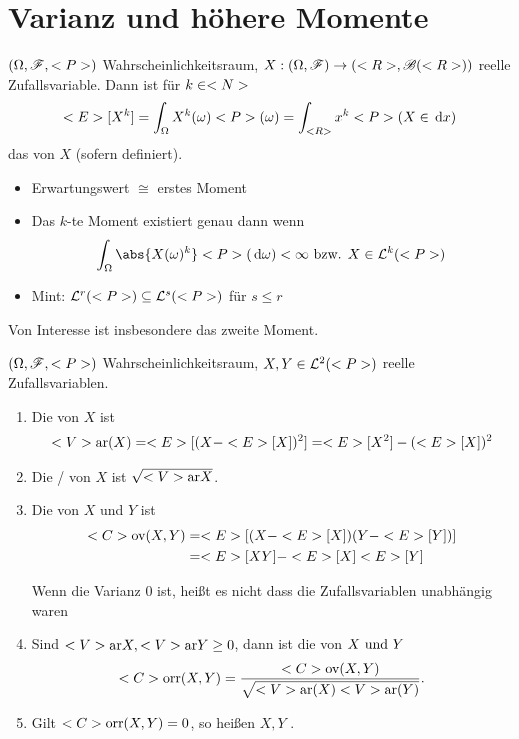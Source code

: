 \section{Varianz und höhere Momente}
\begin{definition}[$k$-te Momente]
	$(\Omega,\mathscr F,<P>)$ Wahrscheinlichkeitsraum, $X: (\Omega,\mathscr F) \to (<R>, \mathscr{B}(<R>))$ reelle Zufallsvariable. Dann ist für $k \in <N>$
	\begin{align*}
		<E>[X^k] = \int_{\Omega} X^k(\omega)<P>(\omega) = \int_{<R>}x^k <P>(X \in \,\mathrm{d} x)
	\end{align*}
	das  von $X$ (sofern definiert).
\end{definition}
\begin{*remark}
	\begin{itemize}
		\item Erwartungswert $\cong$ erstes Moment
		\item Das $k$-te Moment existiert genau dann wenn
		\begin{align*}
			\int_{\O} \abs{X(\omega)^k}\P(\d \omega) < \infty \bzw X \in \Ln{k}(\P)
		\end{align*}
		\item Mint: $\mathcal{L}^{r}(<P>) \subseteq \mathcal{L}^{s}(<P>)$ für $s \le r$
	\end{itemize}
\end{*remark}
Von Interesse ist insbesondere das zweite Moment.
\begin{definition}
	$(\Omega,\mathscr F,<P>)$ Wahrscheinlichkeitsraum, $X,Y \in \mathcal{L}^{2}(<P>)$ reelle Zufallsvariablen.
	\begin{enumerate}
		\item Die  von $X$ ist
		\begin{align*}
			<V>\text{ar} (X) = <E>[(X - <E>[X])^2] = <E>[X^2] - (<E>[X])^2
		\end{align*}
		\item Die / von $X$ ist $\sqrt{<V>\text{ar} X}$.
		\item Die  von $X$ und $Y$ ist
		\begin{align*}
			<C>\text{ov}(X,Y) &= <E>[(X-<E>[X])(Y-<E>[Y])]\\
			&= <E>[XY] - <E>[X]<E>[Y]
		\end{align*}
		\begin{*hint}
			Wenn die Varianz 0 ist, heißt es nicht dass die Zufallsvariablen unabhängig waren
		\end{*hint}
		\item Sind $<V>\text{ar} X, <V>\text{ar} Y\ge 0$, dann ist die  von $X \text{ und } Y$
		\[
			<C>\text{orr}(X,Y) = \frac{<C>\text{ov}(X,Y)}{\sqrt{<V>\text{ar}(X)<V>\text{ar}(Y)}}.
		\] 
		\item Gilt $<C>\text{orr}(X,Y) =0$, so heißen $X,Y$ .
	\end{enumerate}
\end{definition}
